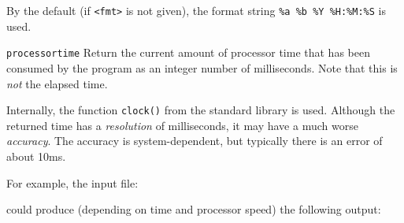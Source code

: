\begin{desctab}
By the default (if \texttt{<fmt>} is not given),
the format string \verb'%a %b %Y %H:%M:%S' is used.

\item[\texttt{processortime}]
Return the current amount of processor time that has been consumed by the
program as an integer number of milliseconds. Note that this is {\em
not} the elapsed time.

Internally, the function \verb'clock()' from the standard {\C} library is
used. Although the returned time has a \emph{resolution} of milliseconds,
it may have a much worse \emph{accuracy}. The accuracy is system-dependent,
but typically there is an error of about 10ms.

\end{desctab}

For example, the input file:
\begin{showfile}

\end{showfile}
could produce (depending on time and processor speed) the following output:
\begin{showfile}

\end{showfile}
